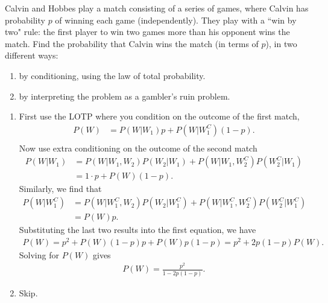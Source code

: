 

\setcounter{theorem}{20}
\begin{exercise}[BH.2.50] 
	Calvin and Hobbes play a match consisting of a series of games, where Calvin has probability $p$ of winning each game (independently). They play with a ``win by two" rule: the first player to win two games more than his opponent wins the match. Find the probability that Calvin wins the match (in terms of $p$), in two different ways:
	\begin{enumerate}
		\item by conditioning, using the law of total probability.
		\item by interpreting the problem as a gambler's ruin problem.
	\end{enumerate}
\begin{solution}
	\begin{enumerate}
		\item First use the LOTP where you condition on the outcome of the first match,
		\begin{align*}
			P(W)& = P(W|W_{1})p + P(W|W_{1}^{C})(1-p).\\
		\end{align*}
		Now use extra conditioning on the outcome of the second match
		\begin{align*}
			P(W|W_{1})& = P(W|W_{1},W_{2})P(W_{2}|W_{1}) + P(W|W_{1},W_{2}^C)P(W_{2}^C|W_{1})\\
			&=1\cdot p + P(W)(1-p).
		\end{align*}
		Similarly, we find that
		\begin{align*}
			P(W|W_{1}^{C}) &= P(W|W_{1}^{C},W_{2})P(W_{2}|W_{1}^{C})+P(W|W_{1}^{C},W_{2}^C)P(W_{2}^C|W_{1}^{C})\\
			&=P(W)p.
		\end{align*}
		Substituting the last two results into the first equation, we have
		\begin{align*}
			P(W) = p^2 + P(W)(1-p)p + P(W)p(1-p) = p^2 +2p(1-p)P(W).
		\end{align*}
		Solving for $P(W)$ gives
		\begin{align*}
			P(W) =\frac{p^2}{1-2p(1-p)}.
		\end{align*}
		\item Skip.
	\end{enumerate}
\end{solution}
\end{exercise}

